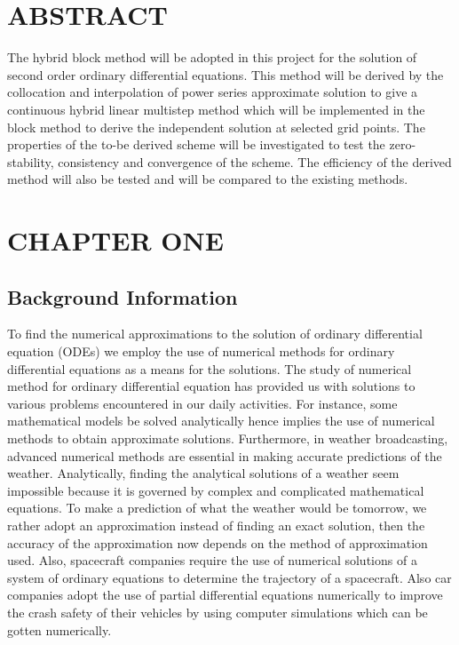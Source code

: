 \documentclass[12pt]{report}
\begin{document}
\chapter*{ABSTRACT}
%
\noindent The hybrid block method will be adopted in this project for the solution of second order ordinary differential equations. This method will be derived by the collocation and interpolation of power series approximate solution to give a continuous hybrid linear multistep method which will be implemented in the block method to derive the independent solution at selected grid points. The properties of the to-be derived scheme will be investigated to test the zero-stability, consistency and convergence of the scheme. The efficiency of the derived method will also be tested and will be compared to the existing methods.
\tableofcontents

%
%
\cleardoublepage
{}
\chapter{CHAPTER ONE}
\section{Background Information}
\noindent To find the numerical approximations to the solution of ordinary differential equation (ODEs) we employ the use of numerical methods for ordinary differential equations as a means for the solutions. The study of numerical method for ordinary differential equation has provided us with solutions to various problems encountered in our daily activities. For instance, some mathematical models be solved analytically hence implies the use of numerical methods to obtain approximate solutions. Furthermore, in weather broadcasting, advanced numerical methods are essential in making accurate predictions of the weather. Analytically, finding the analytical solutions of a weather seem impossible because it is governed by complex and complicated mathematical equations. To make a prediction of what the weather would be tomorrow, we rather adopt an approximation instead of finding an exact solution, then the accuracy of the approximation now depends on the method of approximation used. Also, spacecraft companies require the use of numerical solutions of a system of ordinary equations to determine the trajectory of a spacecraft. Also car companies adopt the use of partial differential equations numerically to improve the crash safety of their vehicles by using computer simulations which can be gotten numerically.
\end{document}
